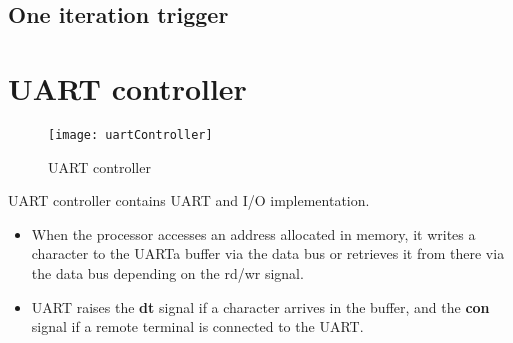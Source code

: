 \subsection*{One iteration trigger}

\section*{UART controller}

\begin{figure}[ht]
	\centering
	\texttt{[image: uartController]}
	\caption{UART controller}
\end{figure}

UART controller contains UART and I/O implementation.

\begin{itemize}
	\item When the processor accesses an address allocated in memory, it writes a character to the UARTa buffer via the data bus or retrieves it from there via the data bus depending on the rd/wr signal.
	\item UART raises the \textbf{dt} signal if a character arrives in the buffer, and the \textbf{con} signal if a remote terminal is connected to the UART.
\end{itemize}
